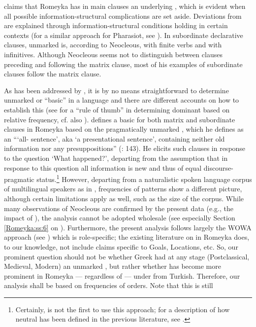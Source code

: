 \documentclass[output=paper,colorlinks,citecolor=brown]{langscibook}
\begin{document}
\citet{neocleousEvolution2022,neocleous_word_2020} claims that Romeyka has in main clauses an underlying  , which is evident when all possible information-structural complications are set aside. Deviations from  are explained through information-structural conditions holding in certain contexts (for a similar approach for Pharasiot, see \citealt{bagriacik_pharasiot_2018}). In subordinate declarative clauses, unmarked  is, according to Neocleous,  with finite verbs and  with infinitives. Although Neocleous seems not to distinguish between  clauses preceding and following the matrix clause, most of his examples of subordinate clauses follow the matrix clause.

As has been addressed by , it is by no means straightforward to determine unmarked or ``basic''  in a language and there are different accounts on how to establish this (see \citealt{dryerDetermining2013} for a ``rule of thumb'' in determining dominant  based on relative frequency, cf. also \citealt{dryerFrequency1995}). \citet{neocleousEvolution2022,neocleous_word_2020} defines a basic  for both matrix and subordinate clauses in Romeyka based on the pragmatically unmarked , which he defines as an ```all- sentence', aka `a presentational  sentence', containing neither old information nor any presuppositions'' (\citealt{neocleous_word_2020}: 143). He elicits such clauses in response to the question `What happened?', departing from the assumption that in response to this question all information is new and thus of equal discourse-pragmatic status.\footnote{Certainly, \citet{neocleous_word_2020} is not the first to use this approach; for a description of how neutral  has been defined in the previous literature, see \citet[146--151]{bagriacik_pharasiot_2018}.} However, departing from a naturalistic spoken language corpus of multilingual speakers as in \citet{schreibergrammar2022}, frequencies of  patterns show a different picture, although certain limitations apply as well, such as the size of the corpus. While many observations of Neocleous are confirmed by the present data (e.g., the impact of ), the analysis cannot be adopted wholesale (see especially Section \ref{Romeyka:ss:6} on ). Furthermore, the present analysis follows largely the WOWA approach (see ) which is role-specific; the existing literature on  in Romeyka does, to our knowledge, not include claims specific to Goals, Locations, etc. So, our prominent question should not be whether Greek had at any stage (Postclassical, Medieval, Modern) an unmarked  , but rather whether  has become more prominent in Romeyka --- regardless of  --- under  from Turkish. Therefore, our analysis shall be based on frequencies of  orders. Note that this is still 
\end{document}
